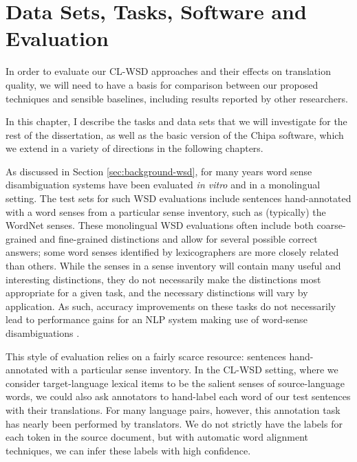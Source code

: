 \chapter{Data Sets, Tasks, Software and Evaluation}
\label{chap:evaluation}
In order to evaluate our CL-WSD approaches and their effects on translation
quality, we will need to have a basis for comparison between our proposed
techniques and sensible baselines, including results reported by other
researchers.

In this chapter, I describe the tasks and data sets that we will investigate
for the rest of the dissertation, as well as the basic version of the Chipa
software, which we extend in a variety of directions in the following chapters.

As discussed in Section \ref{sec:background-wsd}, for many years word sense
disambiguation systems have been evaluated \emph{in vitro} and in a monolingual
setting. The test sets for such WSD evaluations include sentences
hand-annotated with a word senses from a particular sense inventory, such as
(typically) the WordNet senses. These monolingual WSD evaluations often include
both coarse-grained and fine-grained distinctions and allow for several possible
correct answers; some word senses identified by lexicographers are more closely
related than others.  While the senses in a sense inventory will contain many
useful and interesting distinctions, they do not necessarily make the
distinctions most appropriate for a given task, and the necessary distinctions
will vary by application. As such, accuracy improvements on these tasks do not
necessarily lead to performance gains for an NLP system making use of
word-sense disambiguations \cite{resnikwsdapplications}.

This style of evaluation relies on a fairly scarce resource: sentences
hand-annotated with a particular sense inventory.
In the CL-WSD setting, where we consider target-language lexical items to be
the salient senses of source-language words, we could also ask annotators to
hand-label each word of our test sentences with their translations.
For many language pairs, however, this annotation task has nearly been
performed by translators. We do not strictly have the labels for each token in
the source document, but with automatic word alignment techniques, we can infer
these labels with high confidence.

